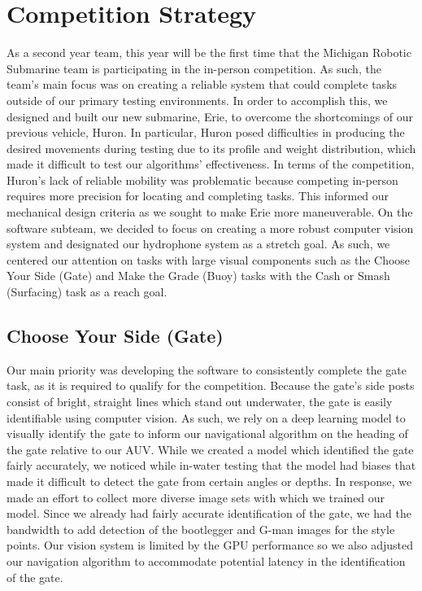 \documentclass[conference]{IEEEtran}
\begin{document}
\section{Competition Strategy}
As a second year team, this year will be the first time that the Michigan Robotic Submarine team is participating in the in-person competition. As such, the team’s main focus was on creating a reliable system that could complete tasks outside of our primary testing environments. In order to accomplish this, we designed and built our new submarine, Erie, to overcome the shortcomings of our previous vehicle, Huron. In particular, Huron posed difficulties in producing the desired movements during testing due to its profile and weight distribution, which made it difficult to test our algorithms' effectiveness. In terms of the competition, Huron's lack of reliable mobility was problematic because competing in-person requires more precision for locating and completing tasks. This informed our mechanical design criteria as we sought to make Erie more maneuverable. On the software subteam, we decided to focus on creating a more robust computer vision system and designated our hydrophone system as a stretch goal. As such, we centered our attention on tasks with large visual components such as the Choose Your Side (Gate) and Make the Grade (Buoy) tasks with the Cash or Smash (Surfacing) task as a reach goal.

\subsection{Choose Your Side (Gate)}\label{AA}
Our main priority was developing the software to consistently complete the gate task, as it is required to qualify for the competition. Because the gate's side posts consist of bright, straight lines which stand out underwater, the gate is easily identifiable using computer vision. As such, we rely on a deep learning model to visually identify the gate to inform our navigational algorithm on the heading of the gate relative to our AUV. While we created a model which identified the gate fairly accurately, we noticed while in-water testing that the model had biases that made it difficult to detect the gate from certain angles or depths. In response, we made an effort to collect more diverse image sets with which we trained our model. Since we already had fairly accurate identification of the gate, we had the bandwidth to add detection of the bootlegger and G-man images for the style points. Our vision system is limited by the GPU performance so we also adjusted our navigation algorithm to accommodate potential latency in the identification of the gate.
\end{document}
